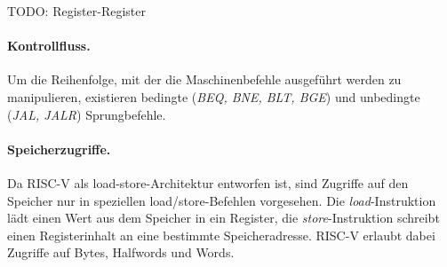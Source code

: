 TODO: Register-Register

\paragraph{Kontrollfluss.}
Um die Reihenfolge, mit der die Maschinenbefehle ausgeführt werden zu manipulieren, existieren bedingte (\textit{BEQ, BNE, BLT, BGE}) und unbedingte (\textit{JAL, JALR}) Sprungbefehle.

\paragraph{Speicherzugriffe.}
Da RISC-V als load-store-Architektur entworfen ist, sind Zugriffe auf den Speicher nur in speziellen load/store-Befehlen vorgesehen. Die \textit{load}-Instruktion lädt einen Wert aus dem Speicher in ein Register, die \textit{store}-Instruktion schreibt einen Registerinhalt an eine bestimmte Speicheradresse. RISC-V erlaubt dabei Zugriffe auf Bytes, Halfwords und Words.

